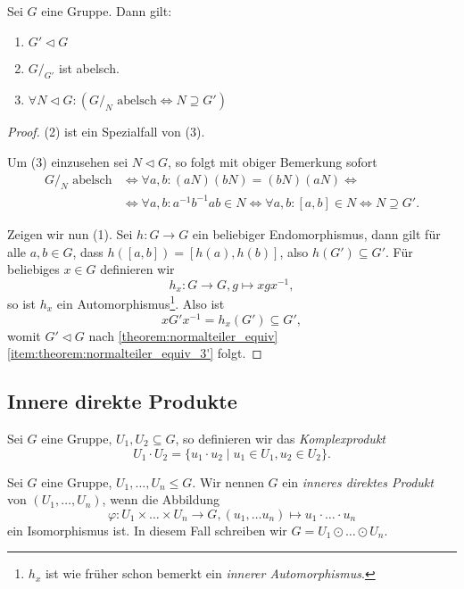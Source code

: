 \begin{theorem}\label{theorem:kommutatorgruppe}
    Sei $G$ eine Gruppe. Dann gilt:
    \begin{enumerate}
        \item $G' \vartriangleleft G$
        \item $G/_{G'}$ ist abelsch.
        \item $\forall N \vartriangleleft G: ( G/_N \textrm{ abelsch} \Leftrightarrow N \supseteq G')$
    \end{enumerate}
\end{theorem}

\begin{proof}
    (2) ist ein Spezialfall von (3).

    Um (3) einzusehen sei $N \vartriangleleft G$, so folgt mit obiger Bemerkung sofort
    \begin{align*}
        G/_N \textrm{ abelsch} &\Leftrightarrow \forall a, b: (aN)(bN) = (bN)(aN) \Leftrightarrow \\ &\Leftrightarrow \forall a, b: a^{-1}b^{-1} a b \in N \Leftrightarrow \forall a, b: [a, b] \in N \Leftrightarrow N \supseteq G'.
    \end{align*}

    Zeigen wir nun (1). Sei $h : G \to G$ ein beliebiger Endomorphismus, dann gilt für alle $a, b \in G$, dass $h([a,b]) = [h(a), h(b)]$, also $h(G') \subseteq G'$. Für beliebiges $x \in G$ definieren wir
    $$ h_x : G \to G, g \mapsto xgx^{-1}, $$
    so ist $h_x$ ein Automorphismus\footnote{$h_x$ ist wie früher schon bemerkt ein \emph{innerer Automorphismus}.}. Also ist
    $$ x G' x^{-1} = h_x(G') \subseteq G', $$
    womit $G' \vartriangleleft G$ nach \cref{theorem:normalteiler_equiv} \cref{item:theorem:normalteiler_equiv_3'} folgt.
\end{proof}

\subsection{Innere direkte Produkte}

\begin{definition}\label{def:komplexprodukt}
    Sei $G$ eine Gruppe, $U_1, U_2 \subseteq G$, so definieren wir das \emph{Komplexprodukt}
    $$ U_1 \cdot U_2 = \{ u_1 \cdot u_2 \mid u_1 \in U_1, u_2 \in U_2 \}. $$
\end{definition}

\begin{definition} \label{def:direktes-inneres-produkt}
    Sei $G$ eine Gruppe, $U_1, \hdots, U_n \leq G$. Wir nennen $G$ ein \emph{inneres direktes Produkt} von $(U_1, \hdots, U_n)$, wenn die Abbildung
    $$ \varphi : U_1 \times \hdots \times U_n \to G, (u_1, \hdots u_n) \mapsto u_1 \cdot \hdots \cdot u_n $$
    ein Isomorphismus ist. In diesem Fall schreiben wir $G = U_1 \odot \hdots \odot U_n$.
\end{definition}

